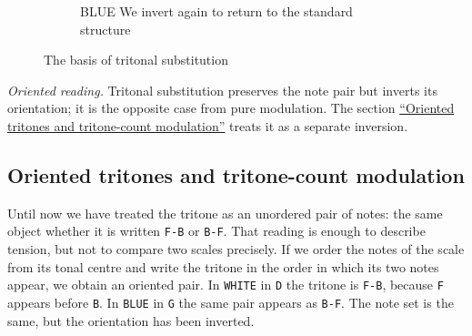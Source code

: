 \documentclass[]{report}
\begin{document}
\begin{figure}[H]
\begin{subfigure}{0.29\textwidth}
	\end{subfigure}
	\hfill
	\begin{subfigure}{0.29\textwidth}
		\centering
		\captionsetup{width=\textwidth}
		\caption{\textsf{BLUE} We invert again to return to the standard structure}

	\end{subfigure}
	\hfill
	\caption{The basis of tritonal substitution}\label{fig:tritonal-substitution}
\end{figure}

\emph{Oriented reading.} Tritonal substitution preserves the note pair but
inverts its orientation; it is the opposite case from pure modulation.
The section \hyperref[sec:oriented-tritones]{``Oriented tritones and tritone-count modulation''} treats it as a separate inversion.
 
  
\subsection{Oriented tritones and tritone-count modulation}
\label{sec:oriented-tritones}

Until now we have treated the tritone as an unordered pair of notes: the same
object whether it is written \texttt{F-B} or \texttt{B-F}. That reading is
enough to describe tension, but not to compare two scales precisely. If we
order the notes of the scale from its tonal centre and write the tritone in the
order in which its two notes appear, we obtain an oriented pair. In
\texttt{WHITE} in \texttt{D} the tritone is \texttt{F-B}, because \texttt{F}
appears before \texttt{B}. In \texttt{BLUE} in \texttt{G} the same pair appears
as \texttt{B-F}. The note set is the same, but the orientation has been
inverted.
\end{document}

